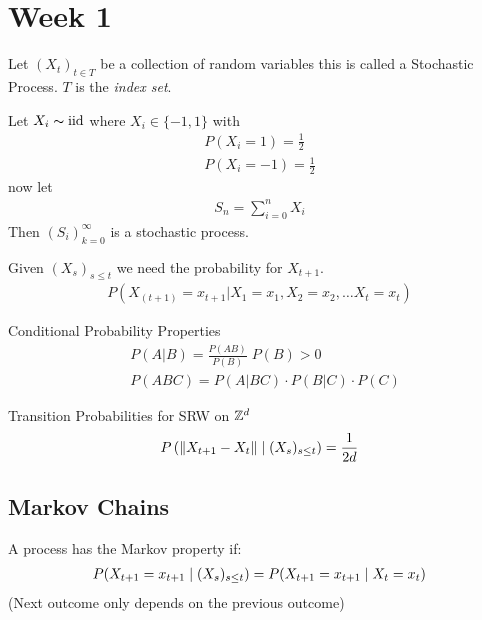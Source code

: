 \documentclass[12pt,a4paper]{article}
\begin{document}
\newpage
\section{Week 1}
\begin{defn}
Let $(X_t)_{t\in T}$ be a collection of random variables this is called a Stochastic Process. $T$ is the \textit{index set}. 
\end{defn}
\begin{example}
Let $X_i\thicksim \mathrm{iid}$ where $X_i \in \{-1,1\}$ with 
\begin{align*}
P(X_i = 1) = \frac{1}{2}\\
P(X_i = -1) = \frac{1}{2}
\end{align*}
now let 
\begin{align*}
S_n = \sum_{i=0}^n X_i
\end{align*}
Then $(S_i)_{k=0}^\infty$ is a stochastic process.  
\end{example}

\begin{defn}
Given $(X_s)_{s \leq t}$ we need the probability for $X_{t+1}$.
\begin{align*}
P(X_{(t+1)} = x_{t+1} \vert X_1 = x_1 , X_2 = x_2, \ldots X_t = x_t)
\end{align*}
\end{defn}


\begin{note}{Conditional Probability Properties}
\begin{align*}
&P(A | B) = \frac{P(AB)}{P(B)} \; P(B) > 0\\
&P(ABC) = P(A|BC) \cdot P(B|C) \cdot P(C)
\end{align*}
\end{note}

\begin{example}{Transition Probabilities for SRW on $\mathbb{Z}^d$}
\begin{align*}
P\left(\norm{X_{t+1} - X_{t}} \;\vert\; (X_{s})_{s \leq t} \right) = \frac{1}{2d} 
\end{align*}
\end{example}
\newpage
\subsection{Markov Chains}
\begin{defn}
\label{markovprop}
A process has the Markov property if:
\begin{align*}
P(X_{t+1}= x_{t+1} \;\vert\; (X_{s})_{s\leq t}) = P(X_{t+1} = x_{t+1} \;\vert\; X_{t} = x_t)
\end{align*}
(Next outcome only depends on the previous outcome)
\end{defn}
\end{document}
